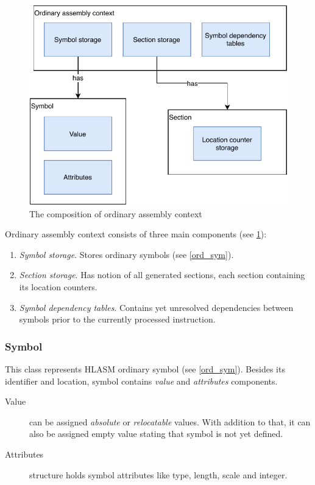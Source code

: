 \begin{figure}
	\centering
	\includegraphics[width=\textwidth]{img/ord_ctx_arch}
	\caption{The composition of ordinary assembly context}
	\label{fig06:ord_ctx}
\end{figure}

Ordinary assembly context consists of three main components (see \cref{fig06:ord_ctx}):
\begin{enumerate}
	\item \emph{Symbol storage}. Stores ordinary symbols (see \cref{ord_sym}).
	\item \emph{Section storage}. Has notion of all generated sections, each section containing its location counters.
	\item \emph{Symbol dependency tables}. Contains yet unresolved dependencies between symbols prior to the currently processed instruction.
\end{enumerate}

\subsubsection{Symbol}

This class represents HLASM ordinary symbol (see \cref{ord_sym}). Besides its identifier and location, symbol contains \emph{value} and \emph{attributes} components.

\begin{description}
	\item[Value] can be assigned \emph{absolute} or \emph{relocatable} values. With addition to that, it can also be assigned empty value stating that symbol is not yet defined.
	\item[Attributes] structure holds symbol attributes like type, length, scale and integer.
\end{description}

